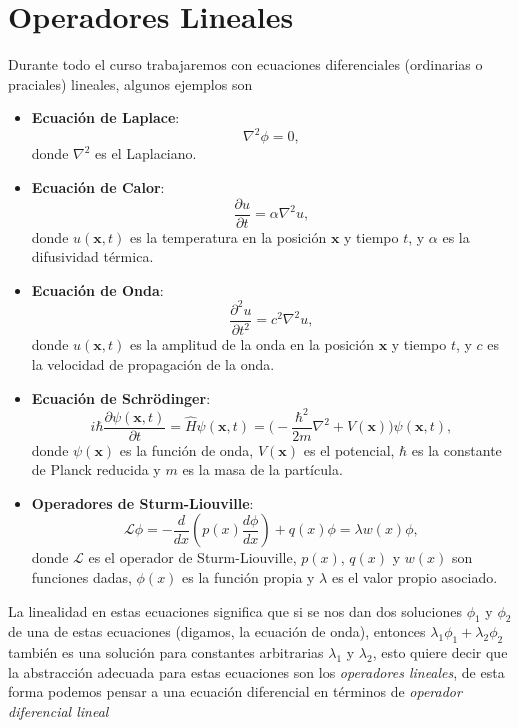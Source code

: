 \documentclass[main.tex]{subfiles}
\begin{document}
\section{Operadores Lineales}
\noindent Durante todo el curso trabajaremos con ecuaciones diferenciales (ordinarias o praciales) lineales, algunos ejemplos son
\begin{itemize}
    \item \textbf{Ecuación de Laplace}:
    \[
    \nabla^2 \phi = 0,
    \]
    donde \(\nabla^2\) es el Laplaciano.

    \item \textbf{Ecuación de Calor}:
    \[
    \frac{\partial u}{\partial t} = \alpha \nabla^2 u,
    \]
    donde \(u(\mathbf{x}, t)\) es la temperatura en la posición \(\mathbf{x}\) y tiempo \(t\), y \(\alpha\) es la difusividad térmica.

    \item \textbf{Ecuación de Onda}:
    \[
    \frac{\partial^2 u}{\partial t^2} = c^2 \nabla^2 u,
    \]
    donde \(u(\mathbf{x}, t)\) es la amplitud de la onda en la posición \(\mathbf{x}\) y tiempo \(t\), y \(c\) es la velocidad de propagación de la onda.

    \item \textbf{Ecuación de Schrödinger}:
   \[
   i\hbar \frac{\partial \psi(\mathbf{x}, t)}{\partial t} = \hat{H} \psi(\mathbf{x}, t)= \Big(-\frac{\hbar^2}{2m}\nabla^2+V(\mathbf{x})\Big)\psi(\mathbf{x}, t),
   \]
    donde \(\psi(\mathbf{x})\) es la función de onda, \(V(\mathbf{x})\) es el potencial, \(\hbar\) es la constante de Planck reducida y \(m\) es la masa de la partícula.

    \item \textbf{Operadores de Sturm-Liouville}:
    \[
    \mathcal{L} \phi = -\frac{d}{dx} \left( p(x) \frac{d\phi}{dx} \right) + q(x) \phi = \lambda w(x) \phi,
    \]
    donde \(\mathcal{L}\) es el operador de Sturm-Liouville, \(p(x)\), \(q(x)\) y \(w(x)\) son funciones dadas, \(\phi(x)\) es la función propia y \(\lambda\) es el valor propio asociado.
\end{itemize}

\noindent La linealidad en estas ecuaciones significa que si se nos dan dos soluciones \(\phi_1\) y \(\phi_2\) de una de estas ecuaciones (digamos, la ecuación de onda), entonces \(\lambda_1 \phi_1 + \lambda_2 \phi_2\) también es una solución para constantes arbitrarias \(\lambda_1\) y \(\lambda_2\), esto quiere decir que la abstracción adecuada para estas ecuaciones son los \emph{operadores lineales}, de esta forma podemos pensar a una ecuación diferencial en términos de \emph{operador diferencial lineal}
\end{document}
